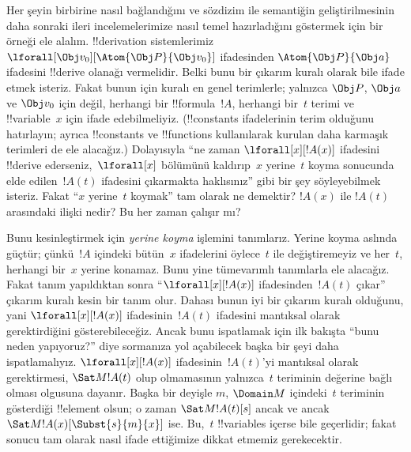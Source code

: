 



Her şeyin birbirine nasıl bağlandığını ve sözdizim ile semantiğin
geliştirilmesinin daha sonraki ileri incelemelerimize nasıl temel
hazırladığını göstermek için bir örneği ele alalım. !!{derivation}
sistemlerimiz $\lforall[\Obj v_0][\Atom{\Obj P}{\Obj v_0}]$
ifadesinden $\Atom{\Obj P}{\Obj a}$ ifadesini !!{derive} olanağı
vermelidir. Belki bunu bir çıkarım kuralı olarak bile ifade etmek
isteriz. Fakat bunun için kuralı en genel terimlerle; yalnızca
$\Obj P$, $\Obj a$ ve $\Obj v_0$ için değil, herhangi bir
!!{formula}~$!A$, herhangi bir~$t$ terimi ve !!{variable}~$x$ için
ifade edebilmeliyiz. (!!{constant}s ifadelerinin terim olduğunu
hatırlayın; ayrıca !!{constant}s ve !!{function}s kullanılarak kurulan
daha karmaşık terimleri de ele alacağız.) Dolayısıyla ``ne zaman
$\lforall[x][!A(x)]$ ifadesini !!{derive} ederseniz,~$\lforall[x]$
bölümünü kaldırıp~$x$ yerine~$t$ koyma sonucunda elde edilen~$!A(t)$
ifadesini çıkarmakta haklısınız'' gibi bir şey söyleyebilmek isteriz.
Fakat ``$x$ yerine~$t$ koymak'' tam olarak ne demektir? $!A(x)$ ile
$!A(t)$ arasındaki ilişki nedir? Bu her zaman çalışır mı?

Bunu kesinleştirmek için \emph{yerine koyma} işlemini tanımlarız.
Yerine koyma aslında güçtür; çünkü~$!A$ içindeki bütün~$x$ ifadelerini
öylece~$t$ ile değiştiremeyiz ve her~$t$, herhangi bir~$x$ yerine
konamaz. Bunu yine tümevarımlı tanımlarla ele alacağız. Fakat tanım
yapıldıktan sonra ``$\lforall[x][!A(x)]$ ifadesinden~$!A(t)$ çıkar''
çıkarım kuralı kesin bir tanım olur. Dahası bunun iyi bir çıkarım
kuralı olduğunu, yani $\lforall[x][!A(x)]$ ifadesinin~$!A(t)$
ifadesini mantıksal olarak gerektirdiğini gösterebileceğiz. Ancak bunu
ispatlamak için ilk bakışta ``bunu neden yapıyoruz?'' diye sormanıza
yol açabilecek başka bir şeyi daha ispatlamalıyız.
$\lforall[x][!A(x)]$ ifadesinin~$!A(t)$'yi mantıksal olarak
gerektirmesi, $\Sat M{!A(t)}$ olup olmamasının yalnızca~$t$ teriminin
değerine bağlı olması olgusuna dayanır. Başka bir deyişle $m$,
$\Domain M$ içindeki~$t$ teriminin gösterdiği !!{element} olsun; o
zaman $\Sat M{!A(t)}[s]$ ancak ve ancak
$\Sat M{!A(x)}[\Subst{s}{m}{x}]$ ise. Bu,~$t$ !!{variable}s içerse
bile geçerlidir; fakat sonucu tam olarak nasıl ifade ettiğimize dikkat
etmemiz gerekecektir.

